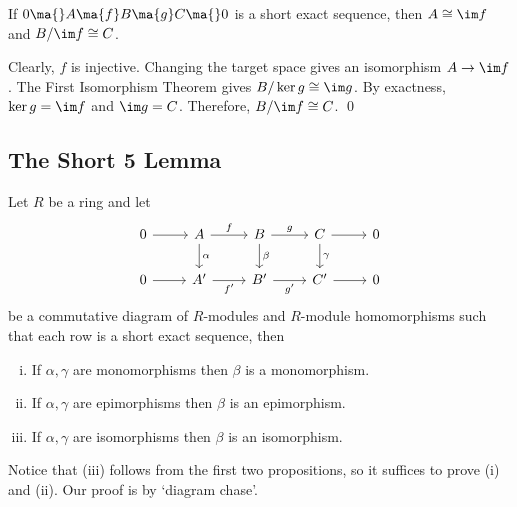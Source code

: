 \begin{prop}
If $0 \ma{} A \ma{f} B \ma{g} C \ma{} 0$ is a short exact sequence, then $A \cong \im f$ and $B/\im f \cong C$.
\end{prop}

\pf Clearly, $f$ is injective. Changing the target space gives an isomorphism $A \to \im f$. The First Isomorphism Theorem gives $B/ \ker g \cong \im g$. By exactness, $\ker g = \im f$ and $\im g=C$. Therefore, $B/\im f \cong C$. \qed \\



\subsection{The Short 5 Lemma}


\begin{lem} \label{lem:shortfive}
Let $R$ be a ring and let
	\[
	\begin{tikzcd}
	0 \arrow{r} & A \arrow{r}{f} \arrow{d}{\alpha} & B \arrow{r}{g} \arrow{d}{\beta} & C \arrow{r} \arrow{d}{\gamma} & 0 \\
	0 \arrow{r} & A' \arrow[swap]{r}{f'} & B' \arrow[swap]{r}{g'} & C' \arrow{r} & 0
	\end{tikzcd}
	\]
be a commutative diagram of $R$-modules and $R$-module homomorphisms such that each row is a short exact sequence, then 
	\begin{enumerate}[(i)]
	\item If $\alpha,\gamma$ are monomorphisms then $\beta$ is a monomorphism.
	\item If $\alpha,\gamma$ are epimorphisms then $\beta$ is an epimorphism. 
	\item If $\alpha,\gamma$ are isomorphisms then $\beta$ is an isomorphism. 
	\end{enumerate}
\end{lem}

\pf Notice that (iii) follows from the first two propositions, so it suffices to prove (i) and (ii). Our proof is by `diagram chase'.

